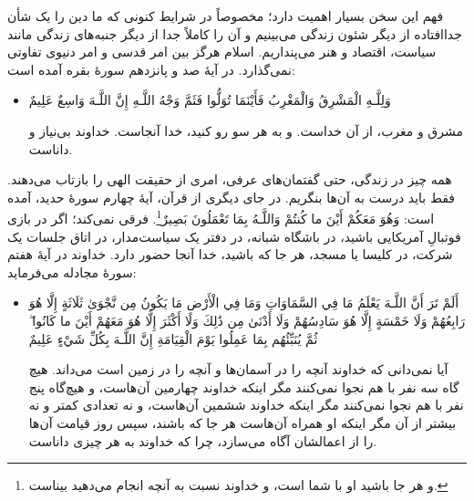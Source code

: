فهم این سخن بسیار اهمیت دارد؛ مخصوصاً در شرایط کنونی که ما دین را یک شأن جداافتاده از دیگر شئون زندگی می‌بینیم و آن را کاملاً جدا از دیگر جنبه‌های زندگی مانند سیاست، اقتصاد و هنر می‌پنداریم. اسلام هرگز بین امر قدسی و امر دنیوی تفاوتی نمی‌گذارد. در آیهٔ صد و پانزدهم سورهٔ بقره آمده است: 

\begin{itemize}
	\item[]
	
	{
		وَلِلَّـهِ الْمَشْرِقُ وَالْمَغْرِبُ  فَأَيْنَمَا تُوَلُّوا فَثَمَّ وَجْهُ اللَّـهِ  إِنَّ اللَّـهَ وَاسِعٌ عَلِيمٌ
	}
	
	{
		مشرق و مغرب، از آن خداست. و به هر سو رو کنید، خدا آنجاست. خداوند بی‌نیاز و داناست.
	}
\end{itemize}

همه چیز در زندگی، حتی گفتمان‌های عرفی، امری از حقیقت الهی را بازتاب می‌دهند. فقط باید درست به آن‌ها بنگریم. در جای دیگری از قرآن، آیهٔ چهارم سورهٔ حدید، آمده است:  { وَهُوَ مَعَكُمْ أَيْنَ ما كُنتُمْ  وَاللَّـهُ بِمَا تَعْمَلُونَ بَصِيرٌ}\footnote{و هر جا باشید او با شما است، و خداوند نسبت به آنچه انجام می‌دهید بیناست.}. فرقی نمی‌کند؛ اگر در بازی فوتبالِ آمریکایی باشید، در باشگاه شبانه، در دفتر یک سیاست‌مدار، در اتاق جلسات یک شرکت، در کلیسا یا مسجد، هر جا که باشید، خدا آنجا حضور دارد. خداوند در آیهٔ هفتم سورهٔ‌ مجادله می‌فرماید:

\begin{itemize}
	\item[]
	{
		أَلَمْ تَرَ أَنَّ اللَّـهَ يَعْلَمُ مَا فِي السَّمَاوَاتِ وَمَا فِي الْأَرْضِ مَا يَكُونُ مِن نَّجْوَىٰ ثَلَاثَةٍ إِلَّا هُوَ رَابِعُهُمْ وَلَا خَمْسَةٍ إِلَّا هُوَ سَادِسُهُمْ وَلَا أَدْنَىٰ مِن ذَٰلِكَ وَلَا أَكْثَرَ إِلَّا هُوَ مَعَهُمْ أَيْنَ ما كَانُوا ۖ ثُمَّ يُنَبِّئُهُم بِمَا عَمِلُوا يَوْمَ الْقِيَامَةِ إِنَّ اللَّـهَ بِكُلِّ شَيْءٍ عَلِيمٌ
	}
	
	{
		آیا نمی‌دانی که خداوند آنچه را در آسمان‌ها و آنچه را در زمین است می‌داند. هیچ گاه سه نفر با هم نجوا نمی‌کنند مگر اینکه خداوند چهارمین آن‌هاست، و هیچ‌گاه پنج نفر با هم نجوا نمی‌کنند مگر اینکه خداوند ششمین آن‌هاست، و نه تعدادی کمتر و نه بیشتر از آن مگر اینکه او همراه آن‌هاست هر جا که باشند، سپس روز قیامت آن‌ها را از اعمالشان آگاه می‌سازد، چرا که خداوند به هر چیزی داناست. 
	}
\end{itemize}

